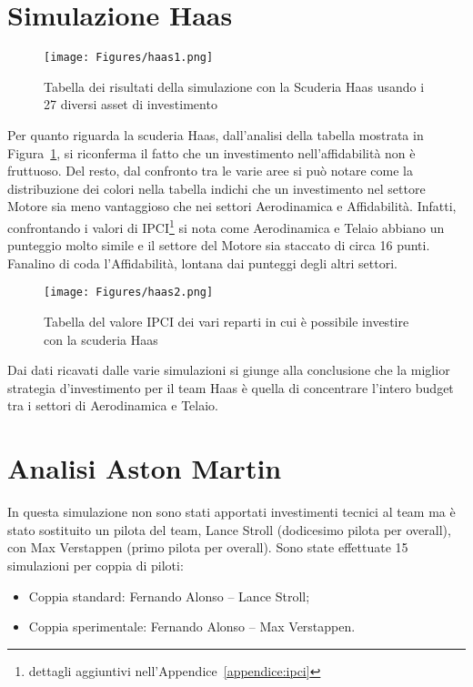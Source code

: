 \newpage

\section{Simulazione Haas}

\begin{figure}[h]
    \centering
    \texttt{[image: Figures/haas1.png]}
    \caption{Tabella dei risultati della simulazione con la Scuderia Haas usando i 27 diversi asset di investimento}
    \label{fig:figura9_7}
\end{figure}

Per quanto riguarda la scuderia Haas, dall’analisi della tabella mostrata in Figura~\ref{fig:figura9_7}, si riconferma il fatto che un investimento nell’affidabilità non è fruttuoso. Del resto, dal confronto tra le varie aree si può notare come la distribuzione dei colori nella tabella indichi che un investimento nel settore Motore sia meno vantaggioso che nei settori Aerodinamica e Affidabilità. Infatti, confrontando i valori di IPCI\footnote{dettagli aggiuntivi nell'Appendice~\ref{appendice:ipci}} si nota come Aerodinamica e Telaio abbiano un punteggio molto simile e il settore del Motore sia staccato di circa 16 punti. Fanalino di coda l’Affidabilità, lontana dai punteggi degli altri settori.

\begin{figure}[h]
    \centering
    \texttt{[image: Figures/haas2.png]}
    \caption{Tabella del valore IPCI dei vari reparti in cui è possibile investire con la scuderia Haas}
    \label{fig:figura9_8}
\end{figure}

Dai dati ricavati dalle varie simulazioni si giunge alla conclusione che la miglior strategia d’investimento per il team Haas è quella di concentrare l’intero budget tra i settori di Aerodinamica e Telaio.

\newpage

\section{Analisi Aston Martin}

In questa simulazione non sono stati apportati investimenti tecnici al team ma è stato sostituito un pilota del team, Lance Stroll (dodicesimo pilota per overall), con Max Verstappen (primo pilota per overall). Sono state effettuate 15 simulazioni per coppia di piloti:
\begin{itemize}
    \item Coppia standard: Fernando Alonso – Lance Stroll;
    \item Coppia sperimentale: Fernando Alonso – Max Verstappen.
\end{itemize}




